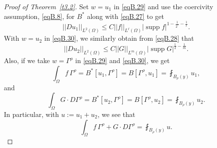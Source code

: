 \documentclass[12pt,reqno]{amsart}
\theoremstyle{plain}
\theoremstyle{definition}
\newenvironment{pf}
{\begin{proof}} {\end{proof}}
\DeclareMathOperator{\supp}{supp}
\newcommand{\Ga}{\Gamma}
\newcommand{\Om}{\Omega}
\newcommand{\norm}[1]{\left\vert \left\vert #1\right\vert\right\vert}
\newcommand{\abs}[1]{\left\vert#1\right\vert}
\newcommand{\pr}[1]{\left( #1 \right) }
\begin{document}
\begin{appendix}
\begin{pf}[Proof of Theorem~\ref{t3.2}]
Set $w=u_1$ in \eqref{eqB.29} and use the coercivity assumption, \eqref{eqB.8}, for ${B}^*$ along with \eqref{eqB.27} to get
\begin{equation}
\label{eqB.31}
\norm{Du_1}_{L^2\pr{\Om}} \le C \norm{f}_{L^{\ell}\pr{\Om}}\abs{\supp f}^{ 1 - \frac {1}{2^*} - \frac 1{\ell}}.
\end{equation}
With $w=u_2$ in \eqref{eqB.30}, we similarly obtain from \eqref{eqB.28} that
\begin{equation}
\label{eqB.32}
\norm{Du_2}_{L^2\pr{\Om}} \le C \norm{G}_{L^{m}\pr{\Om}}\abs{\supp G}^{ \frac {1}{2} - \frac 1{m}}.
\end{equation}
Also, if we take $w = \Ga^\rho$ in \eqref{eqB.29} and \eqref{eqB.30}, we get
\begin{equation}
\label{eqB.33}
\int_\Om f \, \Ga^\rho
= {B}^*[u_1, \Ga^\rho]
= {B}[\Ga^\rho, u_1] 
 = \fint_{B_\rho(y)} u_1,
\end{equation}
and
\begin{equation}
\label{eqB.34}
\int_\Om G \cdot D \Ga^\rho
= {B}^*[u_2, \Ga^\rho]
= {B}[\Ga^\rho, u_2] 
 = \fint_{B_\rho(y)} u_2.
\end{equation}
In particular, with $u:= u_1 + u_2$, we see that
\begin{equation}
\label{eqB.35}
\int_\Om f \, \Ga^\rho + G \cdot D \Ga^\rho
 = \fint_{B_\rho(y)} u.
\end{equation}


\end{pf}
\end{appendix}
\end{document}
